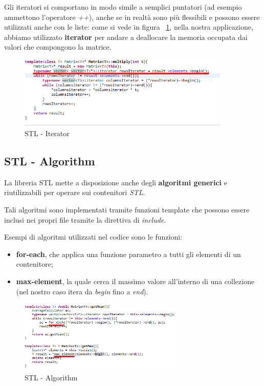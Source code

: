 Gli iteratori si comportano in modo simile a semplici puntatori (ad esempio ammettono l'operatore \textit{++}), anche se in realtà sono più flessibili e possono essere utilizzati anche con le liste: come si vede in figura ~\ref{fig:Iterator}, nella nostra applicazione, abbiamo utilizzato \textbf{iterator} per andare a deallocare la memoria occupata dai valori che compongono la matrice.

\begin{figure}[h]
	\centering
	\includegraphics[width=0.9\textwidth]{Immagini/Stl_Iterator.png}
	\caption{STL - Iterator}
	\label{fig:Iterator}
\end{figure}

\subsection{STL - Algorithm}
La libreria STL mette a disposizione anche degli \textbf{algoritmi generici} e riutilizzabili per operare sui contenitori \textit{STL}.

Tali algoritmi sono implementati tramite funzioni template che possono essere inclusi nei propri file tramite la direttiva di \textit{include}.

Esempi di algoritmi utilizzati nel codice sono le funzioni:
\begin{itemize}
	\item \textbf{for-each}, che applica una funzione parametro a tutti gli
	elementi di un contenitore;
	\item \textbf{max-element}, la quale cerca il massimo valore all'interno di una collezione (nel nostro caso itera da \textit{begin} fino a \textit{end}).
\end{itemize}

\begin{figure}[h]
	\centering
	\includegraphics[width=0.7\textwidth]{Immagini/Stl_Algorithm.png}
	\caption{STL - Algorithm}
	\label{fig:Algoritm}
\end{figure}
